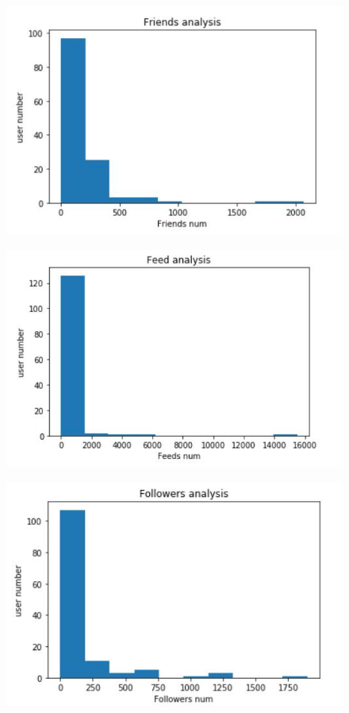 \documentclass[sigconf]{acmart}
\begin{document}
\begin{figure}[h]
\includegraphics[width=\columnwidth]{4.jpg}
\end{figure}
\begin{figure}[h]
\includegraphics[width=\columnwidth]{5.jpg}
\end{figure}
\begin{figure}[h]
\includegraphics[width=\columnwidth]{6.jpg}
\end{figure}
\end{document}
